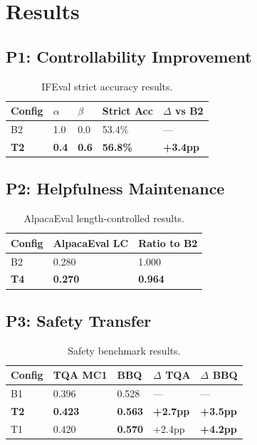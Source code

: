 \section{Results}
\label{sec:results}

\subsection{P1: Controllability Improvement}

\begin{table}[h]
\centering
\caption{IFEval strict accuracy results.}
\label{tab:controllability}
\begin{tabular}{@{}lllll@{}}
\toprule
Config & $\alpha$ & $\beta$ & Strict Acc & $\Delta$ vs B2 \\
\midrule
B2 & 1.0 & 0.0 & 53.4\% & --- \\
\textbf{T2} & \textbf{0.4} & \textbf{0.6} & \textbf{56.8\%} & \textbf{+3.4pp} \\
\bottomrule
\end{tabular}
\end{table}

\subsection{P2: Helpfulness Maintenance}

\begin{table}[h]
\centering
\caption{AlpacaEval length-controlled results.}
\label{tab:helpfulness}
\begin{tabular}{@{}lll@{}}
\toprule
Config & AlpacaEval LC & Ratio to B2 \\
\midrule
B2 & 0.280 & 1.000 \\
\textbf{T4} & \textbf{0.270} & \textbf{0.964} \\
\bottomrule
\end{tabular}
\end{table}

\subsection{P3: Safety Transfer}

\begin{table}[h]
\centering
\caption{Safety benchmark results.}
\label{tab:safety}
\begin{tabular}{@{}lllll@{}}
\toprule
Config & TQA MC1 & BBQ & $\Delta$ TQA & $\Delta$ BBQ \\
\midrule
B1 & 0.396 & 0.528 & --- & --- \\
\textbf{T2} & \textbf{0.423} & \textbf{0.563} & \textbf{+2.7pp} & \textbf{+3.5pp} \\
T1 & 0.420 & \textbf{0.570} & +2.4pp & \textbf{+4.2pp} \\
\bottomrule
\end{tabular}
\end{table}

